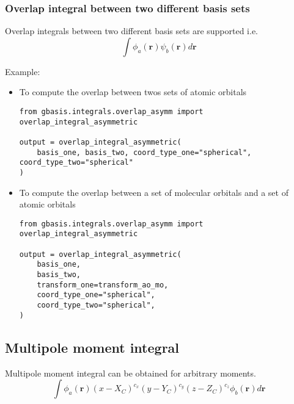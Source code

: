 \documentclass[letterpaper]{article}
\begin{document}
\subsubsection{Overlap integral between two different basis sets}
Overlap integrals between two different basis sets are supported i.e.
\begin{equation}
  \label{eq:overlap}
  \int \phi_a (\mathbf{r}) \psi_b (\mathbf{r}) d\mathbf{r}
\end{equation}

Example:
\begin{itemize}
\item To compute the overlap between twos sets of atomic orbitals
  \begin{lstlisting}[xleftmargin=-25pt]
from gbasis.integrals.overlap_asymm import overlap_integral_asymmetric

output = overlap_integral_asymmetric(
    basis_one, basis_two, coord_type_one="spherical", coord_type_two="spherical"
)
\end{lstlisting}
\item To compute the overlap between a set of molecular orbitals and a set of
  atomic orbitals
\begin{lstlisting}[xleftmargin=-25pt]
from gbasis.integrals.overlap_asymm import overlap_integral_asymmetric

output = overlap_integral_asymmetric(
    basis_one,
    basis_two,
    transform_one=transform_ao_mo,
    coord_type_one="spherical",
    coord_type_two="spherical",
)
\end{lstlisting}
\end{itemize}
\subsection{Multipole moment integral}
Multipole moment integral can be obtained for arbitrary moments.
\begin{equation}
  \label{eq:multipole}
  \int \phi_a (\mathbf{r}) (x - X_C)^{c_x} (y - Y_C)^{c_y} (z - Z_C)^{c_z} \phi_b (\mathbf{r}) d\mathbf{r}
\end{equation}
\end{document}
